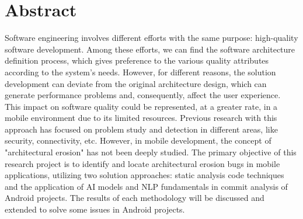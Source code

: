 
\chapter{Abstract}
Software engineering involves different efforts with the same purpose: high-quality software development. Among these efforts, we can find the software architecture definition process, which gives preference to the various quality attributes according to the system's needs. However, for different reasons, the solution development can deviate from the original architecture design, which can generate performance problems and, consequently, affect the user experience. This impact on software quality could be represented, at a greater rate, in a mobile environment due to its limited resources. Previous research with this approach has focused on problem study and detection in different areas, like security, connectivity, etc. However, in mobile development, the concept of "architectural erosion" has not been deeply studied. The primary objective of this research project is to identify and locate architectural erosion bugs in mobile applications, utilizing two solution approaches: static analysis code techniques and the application of AI models and NLP fundamentals in commit analysis of Android projects. The results of each methodology will be discussed and extended to solve some issues in Android projects. 
\endinput

